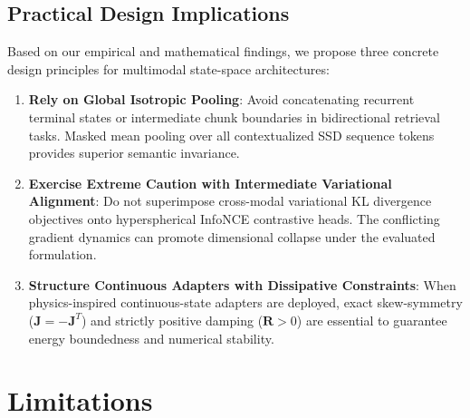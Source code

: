 \documentclass[conference]{IEEEtran}
\begin{document}
\subsection{Practical Design Implications}
Based on our empirical and mathematical findings, we propose three concrete design principles for multimodal state-space architectures:
\begin{enumerate}
    \item \textbf{Rely on Global Isotropic Pooling}: Avoid concatenating recurrent terminal states or intermediate chunk boundaries in bidirectional retrieval tasks. Masked mean pooling over all contextualized SSD sequence tokens provides superior semantic invariance.
    \item \textbf{Exercise Extreme Caution with Intermediate Variational Alignment}: Do not superimpose cross-modal variational KL divergence objectives onto hyperspherical InfoNCE contrastive heads. The conflicting gradient dynamics can promote dimensional collapse under the evaluated formulation.
    \item \textbf{Structure Continuous Adapters with Dissipative Constraints}: When physics-inspired continuous-state adapters are deployed, exact skew-symmetry ($\mathbf{J} = -\mathbf{J}^T$) and strictly positive damping ($\mathbf{R} > 0$) are essential to guarantee energy boundedness and numerical stability.
\end{enumerate}

\section{Limitations}
\label{sec:limitations}
\end{document}
